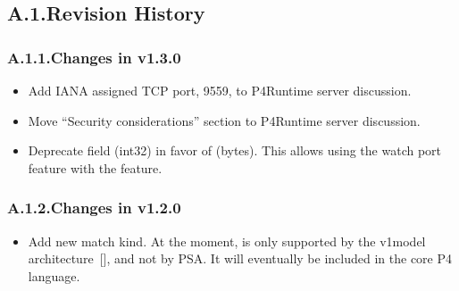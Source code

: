 \documentclass[11pt]{article}
\begin{document}
{%
\subsection{A.1.\hspace*{0.5em}Revision History}\label{sec-revision-history}%

\subsubsection{A.1.1.\hspace*{0.5em}Changes in v1.3.0}\label{sec-changes-in-v130}%

\begin{itemize}[noitemsep,topsep=\mdcompacttopsep]%

\item{}Add IANA assigned TCP port, 9559, to P4Runtime server discussion.%

\item{}Move \textquotedblleft{}Security considerations\textquotedblright{} section to P4Runtime server discussion.%

\item{}Deprecate  field (int32) in favor of  (bytes). This allows
using the watch port feature with the  feature.%
\end{itemize}%

\subsubsection{A.1.2.\hspace*{0.5em}Changes in v1.2.0}\label{sec-changes-in-v120}%

\begin{itemize}[noitemsep,topsep=\mdcompacttopsep]%

\item{}Add new  match kind. At the moment,  is only supported by
the v1model architecture~[], and not by PSA. It will eventually be
included in the core P4 language.%


\end{itemize}}
\end{document}
